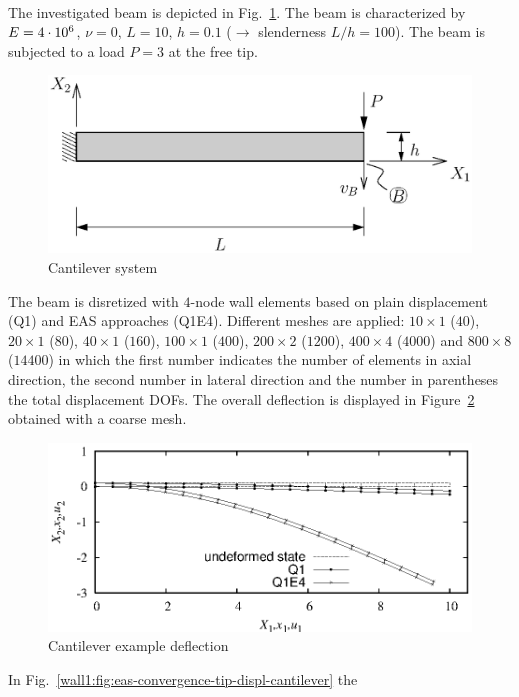 \\
The investigated beam is depicted in
Fig.~\ref{wall1:fig:eas-cantilever-system}\@. The beam is
characterized by $E=4\cdot 10^{6}$, $\nu=0$, $L=10$, $h=0.1$ ($\to$ slenderness
$L/h=100$). The beam is subjected
to a load $P=3$ at the free tip.
\begin{figure}[H]
  \begin{center}
    \includegraphics[width=0.6\linewidth]{eps/cant100-beam-system}
  \end{center}
  \caption{Cantilever system}
  \label{wall1:fig:eas-cantilever-system}
\end{figure}
The beam is disretized with $4$-node wall elements
based on plain displacement (Q1) and EAS approaches (Q1E4). Different meshes
are applied: $10\times1$ ($40$), $20\times1$ ($80$), $40\times1$ ($160$),
$100\times1$ ($400$), $200\times2$ ($1200$), $400\times4$ ($4000$) and
$800\times8$ ($14400$) in which the first number indicates the number of
elements in axial direction, the second number in lateral direction and the
number in parentheses the total displacement DOFs. The overall deflection is
displayed in Figure~\ref{wall1:fig:eas-cantilever-deformation} obtained with a
coarse mesh. 
\begin{figure}[H]
  \begin{center}
    \includegraphics[width=0.9\linewidth]{eps/cant100-system-deformation}
  \end{center}
  \caption{Cantilever example deflection}
  \label{wall1:fig:eas-cantilever-deformation}
\end{figure}
In Fig.~\ref{wall1:fig:eas-convergence-tip-displ-cantilever} the
